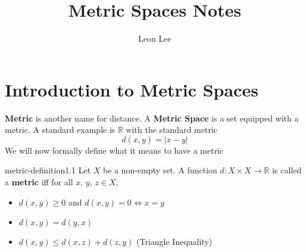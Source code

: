 \documentclass{article}
\title{Metric Spaces Notes}
\author{Leon Lee}
\begin{document}
\maketitle

\newpage
\section{Introduction to Metric Spaces}
\textbf{Metric} is another name for distance. A \textbf{Metric Space} is a set equipped with a metric.
A standard example is $\mathbb{R}$ with the standard metric
\[d(x,y) = \lvert x-y \rvert\]
We will now formally define what it means to have a metric

\begin{dfn}{metric-definition}{1.1}
    Let $X$ be a non-empty set. A function $d: X \times X \to \mathbb{R} $ is called a \textbf{metric} iff for all $x,\,y,\,z\in X$,
    \begin{itemize}
        \item $d(x,y)\ge 0$ and $d(x,y)=0 \iff x = y$\\
        \item $d(x,y)=d(y,x)$\\
        \item $d(x,y)\le d(x,z)+d(z,y)$ (Triangle Inequality)
    \end{itemize}
\end{dfn}
\end{document}

